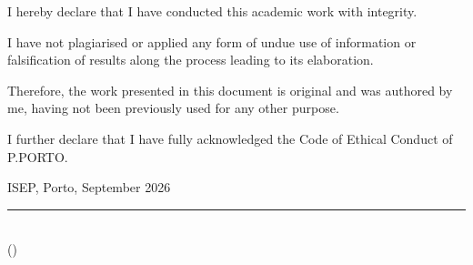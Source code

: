 
\frontmatter %

\pagestyle{plain} %


\maketitlepage


\begin{soi}

\vspace{1cm}


I hereby declare that I have conducted this academic work with integrity.

I have not plagiarised or applied any form of undue use of information or falsification of results along the process leading to its elaboration.

Therefore, the work presented in this document is original and was authored by me, having not been previously used for any other purpose.

I further declare that I have fully acknowledged the Code of Ethical Conduct of P.PORTO.

ISEP, Porto, September 2026

\vspace{2cm}

\begin{flushright}
\rule{7cm}{0.4pt}\\
\authorname{} (\studnumber)
\end{flushright}


\end{soi}


